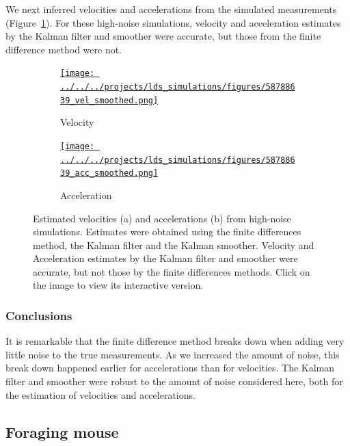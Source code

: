 \documentclass[12pt]{article}
\begin{document}
We next inferred velocities and accelerations from the simulated measurements
(Figure~\ref{fig:vel_acc_high_noise}).  For these high-noise simulations,
velocity and acceleration estimates by the Kalman filter and smoother were
accurate, but those from the finite difference method were not.

\begin{figure}

    \begin{subfigure}{\textwidth}
        \centering
        \href{http://www.gatsby.ucl.ac.uk/~rapela/fwg/lds_repo/inference/figures/58788639_vel_smoothed.html}{\texttt{[image: ../../../projects/lds\_simulations/figures/58788639\_vel\_smoothed.png]}}
        \caption{Velocity}
    \end{subfigure}

    \begin{subfigure}{\textwidth}
        \centering
        \href{http://www.gatsby.ucl.ac.uk/~rapela/fwg/lds_repo/inference/figures/58788639_acc_smoothed.html}{\texttt{[image: ../../../projects/lds\_simulations/figures/58788639\_acc\_smoothed.png]}}
        \caption{Acceleration}
    \end{subfigure}

    \caption{Estimated velocities (a) and accelerations (b) from high-noise
    simulations.  Estimates were obtained using the finite differences method,
    the Kalman filter and the Kalman smoother. Velocity and Acceleration
    estimates by the Kalman filter and smoother were accurate, but not those by
    the finite differences methods. Click on the image to view its interactive
    version.}

    \label{fig:vel_acc_high_noise}

\end{figure}

\subsubsection{Conclusions}

It is remarkable that the finite difference method breaks down when adding very
little noise to the true measurements. As we increased the amount of noise,
this break down happened earlier for accelerations than for velocities.
%
The Kalman filter and smoother were robust to the amount of noise considered
here, both for the estimation of velocities and accelerations.

\subsection{Foraging mouse}
\end{document}
